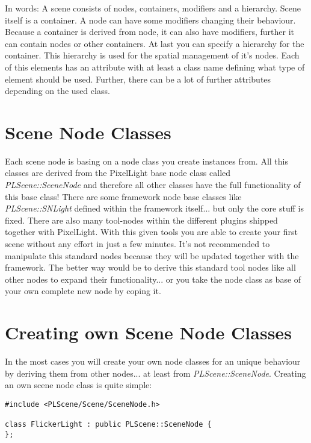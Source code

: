 In words: A scene consists of nodes, containers, modifiers and a hierarchy. Scene itself is a container. A node can have some modifiers changing their behaviour. Because a container is derived from node, it can also have modifiers, further it can contain nodes or other containers. At last you can specify a hierarchy for the container. This hierarchy is used for the spatial management of it's nodes. Each of this elements has an attribute with at least a class name defining what type of element should be used. Further, there can be a lot of further attributes depending on the used class.




\section{Scene Node Classes}
Each scene node is basing on a node class you create instances from. All this classes are derived from the PixelLight base node class called \emph{PLScene::SceneNode} and therefore all other classes have the full functionality of this base class! There are some framework node base classes like \emph{PLScene::SNLight} defined within the framework itself... but only the core stuff is fixed. There are also many tool-nodes within the different plugins shipped together with PixelLight. With this given tools you are able to create your first scene without any effort in just a few minutes. It's not recommended to manipulate this standard nodes because they will be updated together with the framework. The better way would be to derive this standard tool nodes like all other nodes to expand their functionality... or you take the node class as base of your own complete new node by coping it.




\section{Creating own Scene Node Classes}
In the most cases you will create your own node classes for an unique behaviour by deriving them from other nodes... at least from \emph{PLScene::SceneNode}. Creating an own scene node class is quite simple:

\begin{lstlisting}[caption=Creating a new own scene node class]
#include <PLScene/Scene/SceneNode.h>

class FlickerLight : public PLScene::SceneNode {
};
\end{lstlisting}

